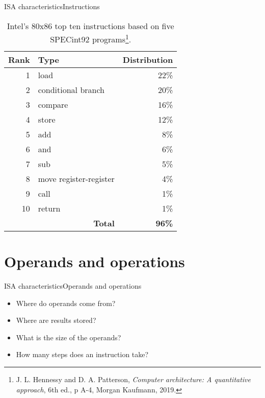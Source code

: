 \documentclass[]{slides}
\begin{document}
\begin{frame}{\acs{ISA} characteristics}{Instructions}
\vspace{-17pt}
\begin{table}[htbp]
    \centering
    \caption{Intel's 80x86 top ten instructions based on five SPECint92 programs\footnote{J. L. Hennessy and D. A. Patterson, \emph{Computer architecture: A quantitative approach}, 6th ed., p A-4, Morgan Kaufmann, 2019.}.}
      \begin{tabular}{r|l|r}
        \hline
  	    \textbf{Rank} & \textbf{Type} & \textbf{Distribution} \\
  	    \hline
  	    \hline
  	    1 & load                        & 22\% \\ \hline
        2 & conditional branch          & 20\% \\ \hline
        3 & compare                     & 16\% \\ \hline
        4 & store                       & 12\% \\ \hline
        5 & add                         & 8\%  \\ \hline
        6 & and                         & 6\%  \\ \hline
        7 & sub                         & 5\%  \\ \hline
        8 & move register-register      & 4\%  \\ \hline
        9 & call                        & 1\%  \\ \hline
       10 & return                      & 1\%  \\ \hline\hline
    \multicolumn{2}{r|}{\textbf{Total}} & \textbf{96\%} \\ \hline
  	  \end{tabular}
  \end{table}
\end{frame}

\section{Operands and operations}
\begin{frame}{\acs{ISA} characteristics}{Operands and operations}
	\begin{itemize}
	\item Where do operands come from?
	\item Where are results stored? 
	\item What is the size of the operands?
	\item How many steps does an instruction take?
  \end{itemize}
\end{frame}
\end{document}
